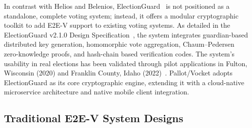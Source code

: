\documentclass[a4paper,fleqn]{cas-sc}
\begin{document}

In contrast with Helios and Belenios, ElectionGuard~\cite{ElectionGuard2019,Benaloh2024} is not positioned as a standalone, complete voting system; instead, it offers a modular cryptographic toolkit to add E2E-V support to existing voting systems. As detailed in the ElectionGuard v2.1.0 Design Specification~\cite{EGSpec2024}, the system integrates guardian-based distributed key generation, homomorphic vote aggregation, Chaum--Pedersen zero-knowledge proofs, and hash-chain based verification codes. The system's usability in real elections has been validated through pilot applications in Fulton, Wisconsin (2020) and Franklin County, Idaho (2022)~\cite{EAC2022}. Pallot/Vocket adopts ElectionGuard as its core cryptographic engine, extending it with a cloud-native microservice architecture and native mobile client integration.

\subsection{Traditional E2E-V System Designs}

\end{document}
